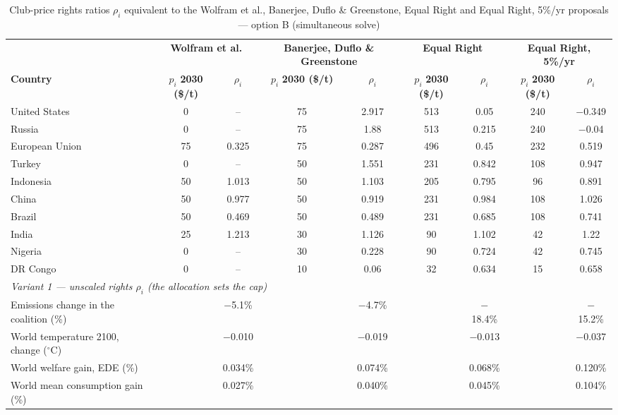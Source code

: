 \begin{table}[htbp]
\centering
\small
\caption{Club-price rights ratios $\rho_i$ equivalent to the Wolfram et al., Banerjee, Duflo \& Greenstone, Equal Right and Equal Right, 5\%/yr proposals --- option B (simultaneous solve)}
\renewcommand{\arraystretch}{1.15}
\begin{tabular}{lcccccccc}
  \toprule
  & \multicolumn{2}{c}{\textbf{Wolfram et al.}} & \multicolumn{2}{c}{\textbf{Banerjee, Duflo \& Greenstone}} & \multicolumn{2}{c}{\textbf{Equal Right}} & \multicolumn{2}{c}{\textbf{Equal Right, 5\%/yr}} \\
  \cmidrule(lr){2-3} \cmidrule(lr){4-5} \cmidrule(lr){6-7} \cmidrule(lr){8-9}
  \textbf{Country} & $p_i$ \textbf{2030 (\$/t)} & $\rho_i$ & $p_i$ \textbf{2030 (\$/t)} & $\rho_i$ & $p_i$ \textbf{2030 (\$/t)} & $\rho_i$ & $p_i$ \textbf{2030 (\$/t)} & $\rho_i$ \\
  \midrule
  United States & 0 & -- & 75 & 2.917 & 513 & 0.05 & 240 & $-$0.349 \\
  Russia & 0 & -- & 75 & 1.88 & 513 & 0.215 & 240 & $-$0.04 \\
  European Union & 75 & 0.325 & 75 & 0.287 & 496 & 0.45 & 232 & 0.519 \\
  Turkey & 0 & -- & 50 & 1.551 & 231 & 0.842 & 108 & 0.947 \\
  Indonesia & 50 & 1.013 & 50 & 1.103 & 205 & 0.795 & 96 & 0.891 \\
  China & 50 & 0.977 & 50 & 0.919 & 231 & 0.984 & 108 & 1.026 \\
  Brazil & 50 & 0.469 & 50 & 0.489 & 231 & 0.685 & 108 & 0.741 \\
  India & 25 & 1.213 & 30 & 1.126 & 90 & 1.102 & 42 & 1.22 \\
  Nigeria & 0 & -- & 30 & 0.228 & 90 & 0.724 & 42 & 0.745 \\
  DR Congo & 0 & -- & 10 & 0.06 & 32 & 0.634 & 15 & 0.658 \\
  \midrule
  \multicolumn{9}{l}{\textit{Variant 1 --- unscaled rights $\rho_i$ (the allocation sets the cap)}} \\
  \quad Emissions change in the coalition (\%) &  & $-$5.1\% &  & $-$4.7\% &  & $-$18.4\% &  & $-$15.2\% \\
  \quad World temperature 2100, change ($^\circ$C) &  & $-$0.010 &  & $-$0.019 &  & $-$0.013 &  & $-$0.037 \\
  \quad World welfare gain, EDE (\%) &  & 0.034\% &  & 0.074\% &  & 0.068\% &  & 0.120\% \\
  \quad World mean consumption gain (\%) &  & 0.027\% &  & 0.040\% &  & 0.045\% &  & 0.104\% \\

\end{tabular}
\end{table}
